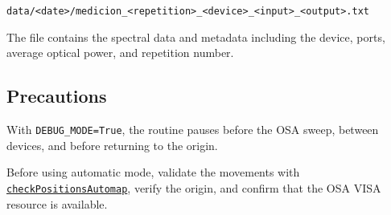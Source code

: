 \begin{center}
\texttt{data/<date>/medicion\_<repetition>\_<device>\_<input>\_<output>.txt}
\end{center}

The file contains the spectral data and metadata including the device, ports,
average optical power, and repetition number.

\subsection{Precautions}

With \texttt{DEBUG\_MODE=True}, the routine pauses before the OSA sweep,
between devices, and before returning to the origin.

Before using automatic mode, validate the movements with
\href{https://github.com/niospinamev2/SurugaSeikiHex/blob/main/rutinas/checkPositionsAutomap.py}
{\texttt{checkPositionsAutomap}}, verify the origin, and confirm that the OSA
VISA resource is available.